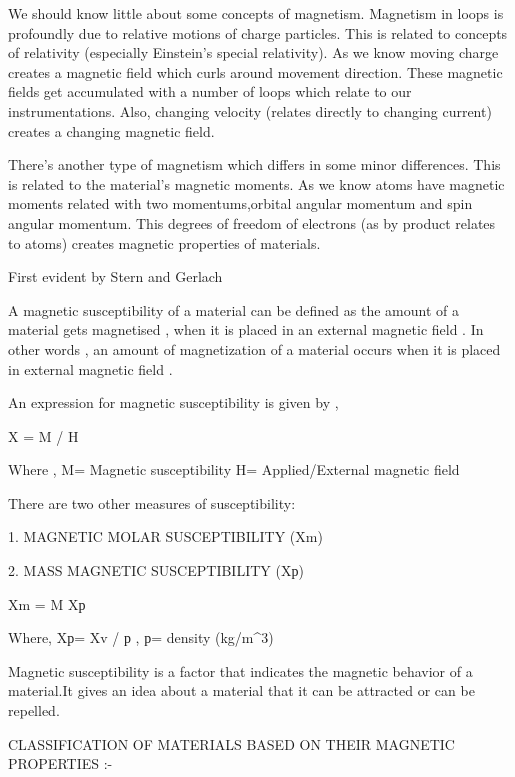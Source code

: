 We should know little about some concepts of magnetism. Magnetism in loops is profoundly due to relative motions of charge particles. This is related to concepts of relativity (especially Einstein’s special relativity). As we know moving charge creates a magnetic field which curls around movement direction. These magnetic fields get accumulated with a number of loops which relate to our instrumentations. Also, changing velocity (relates directly to changing current) creates a changing magnetic field.

There’s another type of magnetism which differs in some minor differences. This is related to the material’s magnetic moments. As we know atoms have magnetic moments related with two momentums,orbital angular momentum and spin angular momentum. This degrees of freedom of electrons (as by product relates to atoms) creates magnetic properties of materials. 

First evident by Stern and Gerlach 

A magnetic susceptibility of a material can be defined as the amount of a material gets magnetised , when it is placed in an external magnetic field .
In other words , an amount of magnetization of a material occurs when it is placed in external magnetic field .

An expression for magnetic susceptibility is given by ,

                  Χ = M / H

Where , M= Magnetic susceptibility 
              H= Applied/External magnetic field 

There are two other measures of susceptibility:

1. MAGNETIC MOLAR SUSCEPTIBILITY (Χm)

2. MASS MAGNETIC SUSCEPTIBILITY (Χр)

                   Χm = M Χр

Where,  Χр= Χv / р , р= density (kg/m^3)

Magnetic susceptibility is a factor that indicates the magnetic behavior of a material.It gives an idea about a material that it can be attracted or can be repelled. 


CLASSIFICATION OF MATERIALS BASED ON THEIR MAGNETIC PROPERTIES :-

